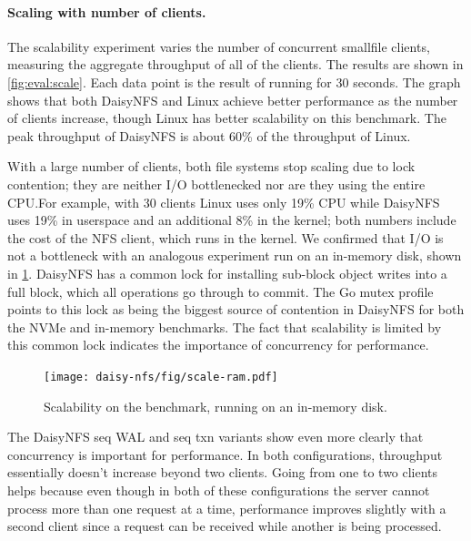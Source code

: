 
\paragraph{Scaling with number of clients.}

The scalability experiment varies the number of concurrent smallfile clients,
measuring the aggregate throughput of all of the clients. The results are shown in \cref{fig:eval:scale}. Each data point is the
result of running for 30 seconds. The graph shows that both DaisyNFS and Linux
achieve better performance as the number of clients increase, though Linux has
better scalability on this benchmark. The peak throughput of DaisyNFS is about
60\% of the throughput of Linux.

With a large number of clients, both file systems
stop scaling due to lock contention; they are neither I/O bottlenecked nor are
they using the entire CPU.\@ For example, with 30 clients Linux uses only 19\% CPU
while DaisyNFS uses 19\% in userspace and an additional 8\% in the kernel; both
numbers include the cost of the NFS client, which runs in the kernel. We
confirmed that I/O is not a bottleneck with an analogous experiment run on an in-memory disk, shown in \cref{fig:eval:scale:ram}. DaisyNFS has a common
lock for installing sub-block object writes into a full block, which all
operations go through to commit. The Go mutex profile points to this lock as
being the biggest source of contention in DaisyNFS for both the NVMe and
in-memory benchmarks. The fact that scalability is limited by this common lock indicates the importance of concurrency for performance.

\begin{figure}[ht]
  \centering
  \texttt{[image: daisy-nfs/fig/scale-ram.pdf]}
  \vspace{0.5\baselineskip}
  \caption[Concurrent smallfile performance on in-memory disk]%
  {Scalability on the  benchmark, running on an in-memory disk.}
  \label{fig:eval:scale:ram}
\end{figure}


The DaisyNFS seq WAL and seq txn variants show even more clearly that
concurrency is important for performance. In both configurations, throughput
essentially doesn't increase beyond two clients. Going from one to two clients
helps because even though in
both of these configurations the server cannot process more than one request at
a time, performance improves slightly with a second client since a request can
be received while another is being processed.

